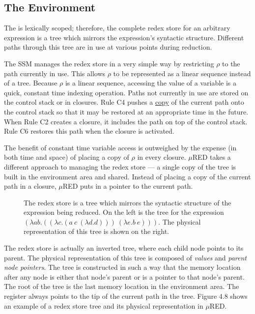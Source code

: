 \subsection{The Environment}

The \lambdacalculus{} is lexically scoped; therefore, the complete redex store for an arbitrary expression is a tree which mirrors the expression's syntactic structure. Different paths through this tree are in use at various points during reduction.

The SSM manages the redex store in a very simple way by restricting \(\rho\) to the path currently in use. This allows \(\rho\) to be represented as a linear sequence instead of a tree. Because \(\rho\) is a linear sequence, accessing the value of a variable is a quick, constant time indexing operation. Paths not currently in use are stored on the control stack or in closures. Rule C4 pushes a \underline{copy} of the current path onto the control stack so that it may be restored at an appropriate time in the future. When Rule C2 creates a closure, it includes the path on top of the control stack. Rule C6 restores this path when the closure is activated.

The benefit of constant time variable access is outweighed by the expense (in both time and space) of placing a copy of \(\rho\) in every closure. \(\mu\)RED takes a different approach to managing the redex store --- a single copy of the tree is built in the environment area and
shared. Instead of placing a copy of the current path in a closure, \(\mu\)RED puts in a pointer to the current path.

\begin{figure}[htbp]
\centering

\caption[The redex store]{The redex store is a tree which mirrors the syntactic structure of the expression being reduced. On the left is the tree for the expression \((\lambda ab.((\lambda c.(a\ c\ (\lambda d.d)))\ (\lambda e.b\ e)))\). The physical representation of this tree is shown on the right.}
\end{figure}

The redex store is actually an inverted tree, where each child node points to its parent. The physical representation of this tree is composed of \emph{values} and \emph{parent node pointers}. The tree is constructed in such a way that the memory location after any node is either that node's parent or is a pointer to that node's parent. The root of the tree is the last memory location in the environment area. The  register always points to the tip of the current path in the tree. Figure 4.8 shows an example of a redex store tree and its physical representation in \(\mu\)RED.

